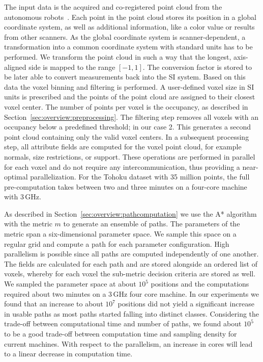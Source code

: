 \documentclass[review,journal]{vgtc}         %
\begin{document}

 The input data is the acquired and co-registered point cloud from the autonomous robots~\cite{KohlbrecherMeyerStrykKlingaufFlexibleSlamSystem2011}. Each point in the point cloud stores its position in a global coordinate system, as well as additional information, like a color value or results from other scanners. As the global coordinate system is scanner-dependent, a transformation into a common coordinate system with standard units has to be performed. We transform the point cloud in such a way that the longest, axis-aligned side is mapped to the range $[-1,1]$. The conversion factor is stored to be later able to convert measurements back into the SI system. Based on this data the voxel binning and filtering is performed. A user-defined voxel size in SI units is prescribed and the points of the point cloud are assigned to their closest voxel center. The number of points per voxel is the occupancy, as described in Section~\ref{sec:overview:preprocessing}. The filtering step removes all voxels with an occupancy below a predefined threshold; in our case 2. This generates a second point cloud containing only the valid voxel centers. In a subsequent processing step, all attribute fields are computed for the voxel point cloud, for example normals, size restrictions, or support. These operations are performed in parallel for each voxel and do not require any intercommunication, thus providing a near-optimal parallelization. For the Tohoku dataset with 35 million points, the full pre-computation takes between two and three minutes on a four-core machine with 3\,GHz. 

 As described in Section~\ref{sec:overview:pathcomputation} we use the A* algorithm with the metric $m$ to generate an ensemble of paths. The parameters of the metric span a six-dimensional parameter space. We sample this space on a regular grid and compute a path for each parameter configuration. High parallelism is possible since all paths are computed independently of one another. The fields are calculated for each path and are stored alongside an ordered list of voxels, whereby for each voxel the sub-metric decision criteria are stored as well. We sampled the parameter space at about $10^5$ positions and the computations required about two minutes on a 3\,GHz four core machine. In our experiments we found that an increase to about $10^7$ positions did not yield a significant increase in usable paths as most paths started falling into distinct classes. Considering the trade-off between computational time and number of paths, we found about $10^5$ to be a good trade-off between computation time and sampling density for current machines. With respect to the parallelism, an increase in cores will lead to a linear decrease in computation time.
\end{document}
